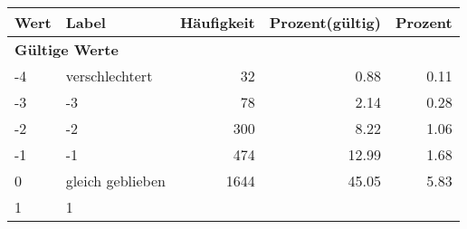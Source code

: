      \begin{longtable}{lXrrr}
     \toprule
     \textbf{Wert} & \textbf{Label} & \textbf{Häufigkeit} & \textbf{Prozent(gültig)} & \textbf{Prozent} \\
     \endhead
     \midrule
     \multicolumn{5}{l}{\textbf{Gültige Werte}}\\

     -4 &
     \multicolumn{1}{X}{ verschlechtert   } &


       \num{32} &
       \num[round-mode=places,round-precision=2]{0.88} &
         \num[round-mode=places,round-precision=2]{0.11} \\

     -3 &
     \multicolumn{1}{X}{ -3   } &


       \num{78} &
       \num[round-mode=places,round-precision=2]{2.14} &
         \num[round-mode=places,round-precision=2]{0.28} \\

     -2 &
     \multicolumn{1}{X}{ -2   } &


       \num{300} &
       \num[round-mode=places,round-precision=2]{8.22} &
         \num[round-mode=places,round-precision=2]{1.06} \\

     -1 &
     \multicolumn{1}{X}{ -1   } &


       \num{474} &
       \num[round-mode=places,round-precision=2]{12.99} &
         \num[round-mode=places,round-precision=2]{1.68} \\

     0 &
     \multicolumn{1}{X}{ gleich geblieben   } &


       \num{1644} &
       \num[round-mode=places,round-precision=2]{45.05} &
         \num[round-mode=places,round-precision=2]{5.83} \\

     1 &
     \multicolumn{1}{X}{ 1   } &



\end{longtable}
